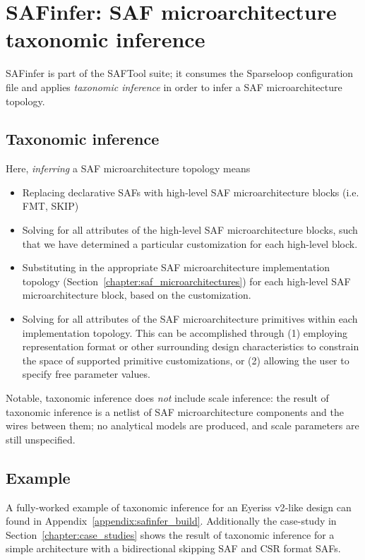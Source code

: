 \section{SAFinfer: SAF microarchitecture taxonomic inference}

SAFinfer is part of the SAFTool suite; it consumes the Sparseloop configuration file and applies \textit{taxonomic inference} in order to infer a SAF microarchitecture topology.

\subsection{Taxonomic inference}

Here, \textit{inferring} a SAF microarchitecture topology means

\begin{itemize}
\item Replacing declarative SAFs with high-level SAF microarchitecture blocks (i.e. FMT, SKIP) 
\item Solving for all attributes of the high-level SAF microarchitecture blocks, such that we have determined a particular customization for each high-level block.
\item Substituting in the appropriate SAF microarchitecture implementation topology (Section~\ref{chapter:saf_microarchitectures}) for each high-level SAF microarchitecture block, based on the customization.
\item Solving for all attributes of the SAF microarchitecture primitives within each implementation topology. This can be accomplished through (1) employing representation format or other surrounding design characteristics to constrain the space of supported primitive customizations, or (2) allowing the user to specify free parameter values.
\end{itemize}

Notable, taxonomic inference does \textit{not} include scale inference: the result of taxonomic inference is a netlist of SAF microarchitecture components and the wires between them; no analytical models are produced, and scale parameters are still unspecified.

\subsection{Example}

A fully-worked example of taxonomic inference for an Eyeriss v2\cite{eyerissv2}-like design can found in Appendix~\ref{appendix:safinfer_build}. Additionally the case-study in Section~\ref{chapter:case_studies} shows the result of taxonomic inference for a simple architecture with a bidirectional skipping SAF and CSR format SAFs.


